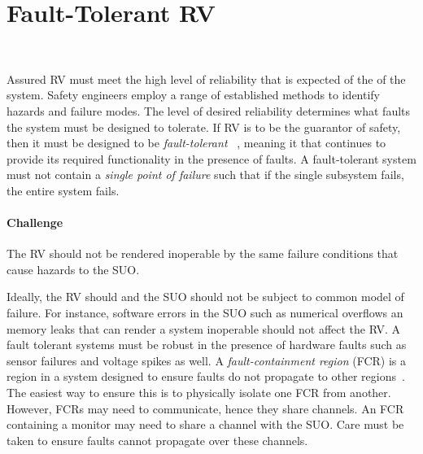 \section{Fault-Tolerant RV}~\label{sec:ft}

 
Assured RV must meet the high level of reliability that is expected of
the of the system. Safety engineers employ a range of established
methods to identify hazards and failure modes. The level of desired
reliability determines what faults the system must be designed to
tolerate. If RV is to be the guarantor of safety, then it must be
designed to be \emph{fault-tolerant} ~\cite{butler-faults}, meaning it
that continues to provide its required functionality in the presence
of faults.  A fault-tolerant system must not contain a \emph{single
  point of failure} such that if the single subsystem fails, the
entire system fails.

\paragraph{Challenge}   The RV  should not be rendered inoperable by the
 same failure conditions that cause hazards to the SUO. 

 Ideally, the RV should and the SUO should not be subject to common
 model of failure.  For instance, software errors in the SUO such as
 numerical overflows an memory leaks that can render a system
 inoperable should not affect the RV.  A fault tolerant systems must
 be robust in the presence of hardware faults such as sensor failures
 and voltage spikes as well.  A \emph{fault-containment region} (FCR)
 is a region in a system designed to ensure faults do not propagate to
 other regions~\cite{Rushby01:buscompare}.   The 
 easiest way to ensure this is to physically isolate one FCR from
 another.  However, FCRs may need to communicate, hence they share
 channels. An FCR containing a monitor may need to share a channel
 with the SUO.  Care must be taken to ensure faults cannot propagate
 over these channels. 


